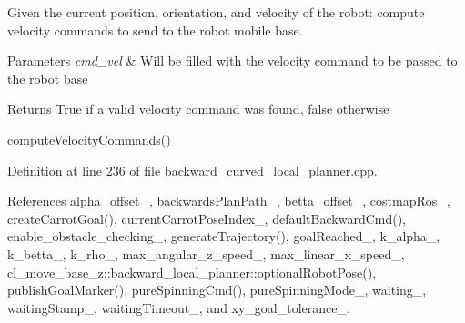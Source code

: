 Given the current position, orientation, and velocity of the robot\+: compute velocity commands to send to the robot mobile base. 


\begin{DoxyParams}{Parameters}
{\em cmd\+\_\+vel} & Will be filled with the velocity command to be passed to the robot base \\
\hline
\end{DoxyParams}
\begin{DoxyReturn}{Returns}
True if a valid velocity command was found, false otherwise
\end{DoxyReturn}
\hyperlink{classcl__move__base__z_1_1backward__local__planner_1_1BackwardLocalPlanner_a25437208766366ca22f967fe72e80988}{compute\+Velocity\+Commands()} 

Definition at line 236 of file backward\+\_\+curved\+\_\+local\+\_\+planner.\+cpp.



References alpha\+\_\+offset\+\_\+, backwards\+Plan\+Path\+\_\+, betta\+\_\+offset\+\_\+, costmap\+Ros\+\_\+, create\+Carrot\+Goal(), current\+Carrot\+Pose\+Index\+\_\+, default\+Backward\+Cmd(), enable\+\_\+obstacle\+\_\+checking\+\_\+, generate\+Trajectory(), goal\+Reached\+\_\+, k\+\_\+alpha\+\_\+, k\+\_\+betta\+\_\+, k\+\_\+rho\+\_\+, max\+\_\+angular\+\_\+z\+\_\+speed\+\_\+, max\+\_\+linear\+\_\+x\+\_\+speed\+\_\+, cl\+\_\+move\+\_\+base\+\_\+z\+::backward\+\_\+local\+\_\+planner\+::optional\+Robot\+Pose(), publish\+Goal\+Marker(), pure\+Spinning\+Cmd(), pure\+Spinning\+Mode\+\_\+, waiting\+\_\+, waiting\+Stamp\+\_\+, waiting\+Timeout\+\_\+, and xy\+\_\+goal\+\_\+tolerance\+\_\+.


